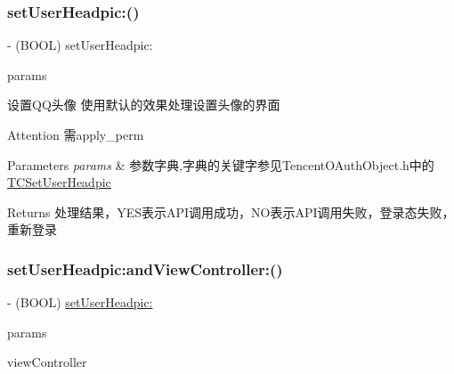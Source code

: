 \subsubsection{\texorpdfstring{set\+User\+Headpic\+:()}{setUserHeadpic:()}\hspace{0.1cm}{\footnotesize\ttfamily [2/2]}}
{\footnotesize\ttfamily -\/ (B\+O\+OL) set\+User\+Headpic\+: \begin{DoxyParamCaption}\item[{(N\+S\+Mutable\+Dictionary $\ast$)}]{params }\end{DoxyParamCaption}}

设置\+Q\+Q头像 使用默认的效果处理设置头像的界面 \begin{DoxyAttention}{Attention}
需apply\+\_\+perm 
\end{DoxyAttention}

\begin{DoxyParams}{Parameters}
{\em params} & 参数字典,字典的关键字参见\+Tencent\+O\+Auth\+Object.\+h中的\mbox{\hyperlink{interface_t_c_set_user_headpic}{T\+C\+Set\+User\+Headpic}} \\
\hline
\end{DoxyParams}
\begin{DoxyReturn}{Returns}
处理结果，\+Y\+E\+S表示\+A\+P\+I调用成功，\+N\+O表示\+A\+P\+I调用失败，登录态失败，重新登录 
\end{DoxyReturn}
\mbox{\label{interface_tencent_o_auth_afd9016fc8dbd669e309fb90f938436a3}} 
\subsubsection{\texorpdfstring{set\+User\+Headpic\+:and\+View\+Controller\+:()}{setUserHeadpic:andViewController:()}\hspace{0.1cm}{\footnotesize\ttfamily [1/2]}}
{\footnotesize\ttfamily -\/ (B\+O\+OL) \mbox{\hyperlink{interface_tencent_o_auth_a2efce592b134d225f092451cdfe7fd99}{set\+User\+Headpic\+:}} \begin{DoxyParamCaption}\item[{(N\+S\+Mutable\+Dictionary $\ast$)}]{params }\item[{andViewController:(U\+I\+View\+Controller $\ast$$\ast$)}]{view\+Controller }\end{DoxyParamCaption}}

